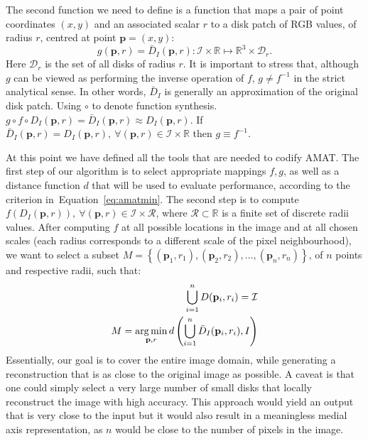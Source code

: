 \documentclass{article}
\newcommand{\refeq}[1]{Equation~\ref{#1}}
\newcommand{\set}[1]{\mathcal{#1}}
\renewcommand{\vec}[1]{\mathbf{#1}}
\def\argmin{\operatornamewithlimits{arg\,min}}
\def\point{\vec{p}}
\def\setreals{\mathbb{R}}
\def\image{\set{I}}
\def\scales{\set{R}}
\begin{document}
The second  function we need to define is a function that maps a pair of point coordinates $(x,y)$ and an 
associated scalar $r$ to a disk patch of RGB values, of radius $r$, centred at point $\point = (x,y)$:
\begin{equation}
g(\point,r) = \bar D_I(\point,r): \image\times\setreals \mapsto \setreals^3 \times \set{D}_r.
\label{eq:g}
\end{equation}
Here $\set{D}_r$ is the set of all disks of radius $r$.
It is important to stress that, although $g$ can be viewed as performing the inverse operation of $f$, $g \neq f^{-1}$ in the strict analytical sense.
In other words, $\bar D_I$ is generally an approximation of the original disk patch.
Using $\circ$ to denote function synthesis. $g \circ f \circ D_I(\point,r) = \bar D_I(\point,r) \approx D_I(\point, r)$.
If $\bar D_I(\point,r) = D_I(\point,r),\ \forall (\point,r) \in \image \times \setreals$ then $g \equiv f^{-1}$.

At this point we have defined all the tools that are needed to codify AMAT. 
The first step of our algorithm is to select appropriate mappings $f,g$, as well as a distance function $d$ that will
be used to evaluate performance, according to the criterion in~\refeq{eq:amatmin}.
The second step is to compute $f\left(D_I(\point,r)\right),\ \forall (\point,r) \in \image \times \scales$, 
where $\scales \subset \setreals$ is a finite set of discrete radii values.
After computing $f$ at all possible locations in the image and at all chosen scales (each radius corresponds to 
a different scale of the pixel neighbourhood), 
we want to select a subset $M = \left\lbrace (\point_1, r_1), (\point_2, r_2),\ldots,(\point_n, r_n) \right\rbrace$, 
of $n$ points and respective radii, such that:
\begin{align}
\bigcup_{i=1}^nD(\point_i,r_i) = \image \label{eq:cover-image} \\
M = \argmin_{\point,r} d\left( \bigcup_{i=1}^n \bar D_I(\point_i,r_i), I \right) \label{eq:minimize-distance}
\end{align}
Essentially, our goal is to cover the entire image domain, while generating a reconstruction that is as close to the original image as possible. 
A caveat is that one could simply select a very large number of small disks that locally reconstruct the image with high accuracy. 
This approach would yield an output that is very close to the input but it would also result in a meaningless medial
axis representation, as $n$ would be close to the number of pixels in the image.
\end{document}
